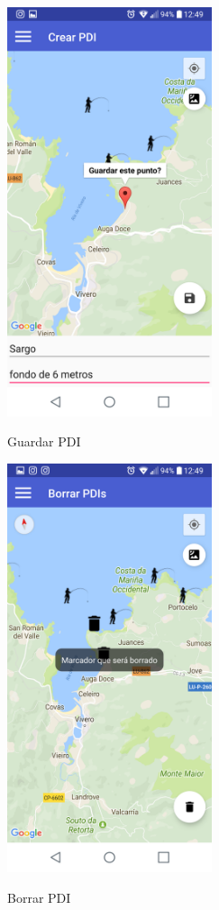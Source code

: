 \begin{figure}[htbp]
\begin{minipage}[b]{0.5\linewidth} %
\centering
\includegraphics[width=6cm]{capturamovil/pdiguardar.png}
 \label{figura1}
\caption{Guardar PDI}

\end{minipage}
\hspace{0.5cm} %
\begin{minipage}[b]{0.5\linewidth}
\centering
\includegraphics[width=6cm]{capturamovil/pdiborrar.png}
 \label{figura2}
\caption{Borrar PDI }

\end{minipage}
\end{figure}



